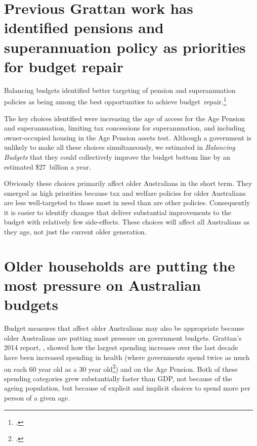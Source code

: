 \section{Previous Grattan work has identified pensions and superannuation policy as priorities for budget repair}\label{sec:SUPER-prev-grattan-work-identified-super}
Balancing budgets identified better targeting of pension and superannuation policies as being among the best opportunities to achieve budget~repair.\footcite[][29]{DaleyMcGannonSavage2013BudgetPressures}

The key choices identified were increasing the age of access for the Age Pension and superannuation, limiting tax concessions for superannuation, and including owner-occupied housing in the Age Pension assets test. Although a government is unlikely to make all these choices simultaneously, we estimated in \emph{Balancing Budgets} that they could collectively improve the budget bottom line by an estimated \$27~billion a year.

Obviously these choices primarily affect older Australians in the short term. They emerged as high priorities because tax and welfare policies for older Australians are less well-targeted to those most in need than are other policies. Consequently it is easier to identify changes that deliver substantial improvements to the budget with relatively few side-effects. These choices will affect all Australians as they age, not just the current older generation. 

\section{Older households are putting the most pressure on Australian budgets}
Budget measures that affect older Australians may also be appropriate because older Australians are putting most pressure on government budgets. Grattan’s 2014 report, , showed how the largest spending increases over the last decade have been increased spending in health (where governments spend twice as much on each 60 year old as a 30 year old\footcite[][25]{DaleyMcGannonHunter2014}) and on the Age Pension. Both of these spending categories grew substantially faster than GDP, not because of the ageing population, but because of explicit and implicit choices to spend more per person of a given age.

